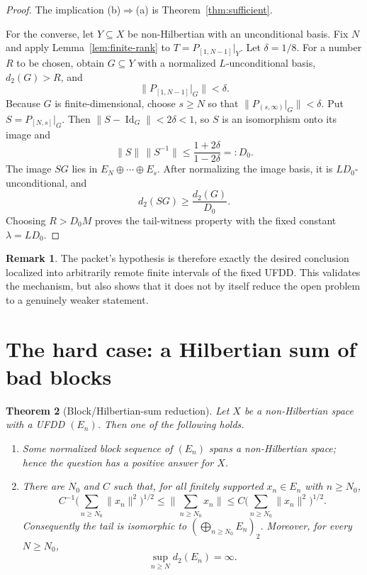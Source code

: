 \documentclass[11pt]{article}
\newtheorem{theorem}{Theorem}[section]
\theoremstyle{definition}
\newtheorem{remark}[theorem]{Remark}
\newcommand{\dd}{d_2}
\newcommand{\Id}{\operatorname{Id}}
\begin{document}
\begin{proof}
The implication (b)$\Rightarrow$(a) is Theorem~\ref{thm:sufficient}.

For the converse, let $Y\subseteq X$ be non-Hilbertian with an unconditional
basis.  Fix $N$ and apply Lemma~\ref{lem:finite-rank} to
$T=P_{[1,N-1]}|_Y$.  Let $\delta=1/8$.  For a number $R$ to be chosen, obtain
$G\subseteq Y$ with a normalized $L$-unconditional basis, $\dd(G)>R$, and
\[
 \|P_{[1,N-1]}|_G\|<\delta.
\]
Because $G$ is finite-dimensional, choose $s\geq N$ so that
$\|P_{(s,\infty)}|_G\|<\delta$.  Put $S=P_{[N,s]}|_G$.  Then
$\|S-\Id_G\|<2\delta<1$, so $S$ is an isomorphism onto its image and
\[
 \|S\|\,\|S^{-1}\|
 \leq \frac{1+2\delta}{1-2\delta}=:D_0.
\]
The image $SG$ lies in $E_N\oplus\cdots\oplus E_s$.  After normalizing the
image basis, it is $LD_0$-unconditional, and
\[
  \dd(SG)\geq \frac{\dd(G)}{D_0}.
\]
Choosing $R>D_0M$ proves the tail-witness property with the fixed constant
$\lambda=LD_0$.
\end{proof}

\begin{remark}
The packet's hypothesis is therefore exactly the desired conclusion localized
into arbitrarily remote finite intervals of the fixed UFDD.  This validates the
mechanism, but also shows that it does not by itself reduce the open problem to
a genuinely weaker statement.
\end{remark}

\section{The hard case: a Hilbertian sum of bad blocks}

\begin{theorem}[Block/Hilbertian-sum reduction]\label{thm:hardcase}
Let $X$ be a non-Hilbertian space with a UFDD $(E_n)$.  Then one of the
following holds.
\begin{enumerate}[label=(\roman*)]
\item Some normalized block sequence of $(E_n)$ spans a non-Hilbertian space;
      hence the question has a positive answer for $X$.
\item There are $N_0$ and $C$ such that, for all finitely supported
      $x_n\in E_n$ with $n\geq N_0$,
      \[
        C^{-1}\Big(\sum_{n\geq N_0}\|x_n\|^2\Big)^{1/2}
        \leq \Big\|\sum_{n\geq N_0}x_n\Big\|
        \leq
        C\Big(\sum_{n\geq N_0}\|x_n\|^2\Big)^{1/2}.
      \]
      Consequently the tail is isomorphic to
      $(\bigoplus_{n\geq N_0}E_n)_2$.  Moreover, for every $N\geq N_0$,
      \[
        \sup_{n\geq N}\dd(E_n)=\infty.
      \]
\end{enumerate}
\end{theorem}
\end{document}
